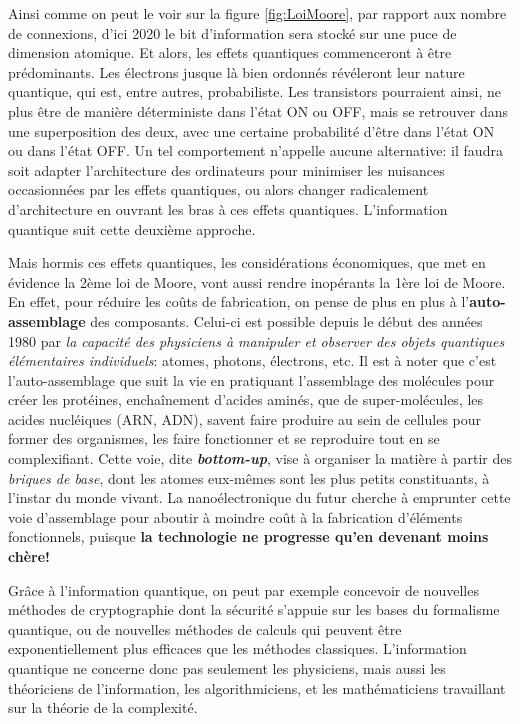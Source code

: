 \documentclass[12pt,a4paper,oneside,openany]{book}%
\numberwithin{equation}{section}
\numberwithin{figure}{section}
\numberwithin{table}{section}
\begin{document}
Ainsi comme on peut le voir sur la figure \ref{fig:LoiMoore}, par rapport aux
nombre de connexions, d'ici 2020 le bit d'information sera stocké sur une puce
de dimension atomique. Et alors, les effets quantiques commenceront à être
prédominants. Les électrons jusque là bien ordonnés révéleront leur nature
quantique, qui est, entre autres, probabiliste. Les transistors pourraient
ainsi, ne plus être de manière déterministe dans l'état ON ou OFF, mais se
retrouver dans une superposition des deux, avec une certaine probabilité d'être
dans l'état ON ou dans l'état OFF. Un tel comportement n'appelle aucune
alternative: il faudra soit adapter l'architecture des ordinateurs pour
minimiser les nuisances occasionnées par les effets quantiques, ou alors changer
radicalement d'architecture en ouvrant les bras à ces effets quantiques.
L'information quantique suit cette deuxième approche.

Mais hormis ces effets quantiques, les considérations économiques, que met en
évidence la 2ème loi de Moore, vont aussi rendre inopérants la 1ère loi de
Moore. En effet, pour réduire les coûts de fabrication, on pense de plus en plus
à l'\textbf{auto-assemblage} des composants. Celui-ci est possible depuis le
début des années 1980 par \emph{la capacité des physiciens à manipuler et
observer des objets quantiques élémentaires individuels}: atomes, photons,
électrons, etc. Il est à noter que c'est l'auto-assemblage que suit la vie en
pratiquant l'assemblage des molécules pour créer les protéines, enchaînement
d'acides aminés, que de super-molécules, les acides nucléiques (ARN, ADN),
savent faire produire au sein de cellules pour former des organismes, les faire
fonctionner et se reproduire tout en se complexifiant. Cette voie, dite
\emph{\textbf{bottom-up}}, vise à organiser la matière à partir des
\emph{briques de base}, dont les atomes eux-mêmes sont les plus petits
constituants, à l'instar du monde vivant. La nanoélectronique du futur cherche à
emprunter cette voie d'assemblage pour aboutir à moindre coût à la fabrication
d'éléments fonctionnels, puisque \textbf{la technologie ne progresse qu'en
devenant moins chère!}

Grâce à l'information quantique, on peut par exemple concevoir de nouvelles
méthodes de cryptographie dont la sécurité s'appuie sur les bases du formalisme
quantique, ou de nouvelles méthodes de calculs qui peuvent être
exponentiellement plus efficaces que les méthodes classiques. L'information
quantique ne concerne donc pas seulement les physiciens, mais aussi les
théoriciens de l'information, les algorithmiciens, et les mathématiciens
travaillant sur la théorie de la complexité.
\end{document}
